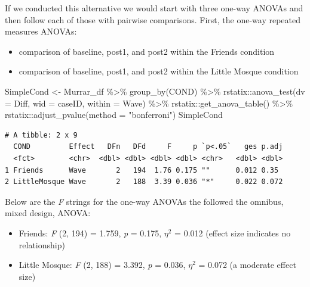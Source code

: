 \documentclass[
  11pt,
]{book}
\newenvironment{Shaded}{\begin{snugshade}}{\end{snugshade}}
\newcommand{\AttributeTok}[1]{\textcolor[rgb]{0.77,0.63,0.00}{#1}}
\newcommand{\FunctionTok}[1]{\textcolor[rgb]{0.00,0.00,0.00}{#1}}
\newcommand{\NormalTok}[1]{#1}
\newcommand{\OtherTok}[1]{\textcolor[rgb]{0.56,0.35,0.01}{#1}}
\newcommand{\SpecialCharTok}[1]{\textcolor[rgb]{0.00,0.00,0.00}{#1}}
\newcommand{\StringTok}[1]{\textcolor[rgb]{0.31,0.60,0.02}{#1}}
\providecommand{\tightlist}{%
  \setlength{\itemsep}{0pt}\setlength{\parskip}{0pt}}
\begin{document}
If we conducted this alternative we would start with three one-way ANOVAs and then follow each of those with pairwise comparisons. First, the one-way repeated measures ANOVAs:

\begin{itemize}
\tightlist
\item
  comparison of baseline, post1, and post2 within the Friends condition
\item
  comparison of baseline, post1, and post2 within the Little Mosque condition
\end{itemize}

\begin{Shaded}
\begin{Highlighting}[]
\NormalTok{SimpleCond }\OtherTok{\textless{}{-}}\NormalTok{ Murrar\_df }\SpecialCharTok{\%\textgreater{}\%}
    \FunctionTok{group\_by}\NormalTok{(COND) }\SpecialCharTok{\%\textgreater{}\%}
\NormalTok{    rstatix}\SpecialCharTok{::}\FunctionTok{anova\_test}\NormalTok{(}\AttributeTok{dv =}\NormalTok{ Diff, }\AttributeTok{wid =}\NormalTok{ caseID, }\AttributeTok{within =}\NormalTok{ Wave) }\SpecialCharTok{\%\textgreater{}\%}
\NormalTok{    rstatix}\SpecialCharTok{::}\FunctionTok{get\_anova\_table}\NormalTok{() }\SpecialCharTok{\%\textgreater{}\%}
\NormalTok{    rstatix}\SpecialCharTok{::}\FunctionTok{adjust\_pvalue}\NormalTok{(}\AttributeTok{method =} \StringTok{"bonferroni"}\NormalTok{)}
\NormalTok{SimpleCond}
\end{Highlighting}
\end{Shaded}

\begin{verbatim}
# A tibble: 2 x 9
  COND         Effect   DFn   DFd     F     p `p<.05`   ges p.adj
  <fct>        <chr>  <dbl> <dbl> <dbl> <dbl> <chr>   <dbl> <dbl>
1 Friends      Wave       2   194  1.76 0.175 ""      0.012 0.35 
2 LittleMosque Wave       2   188  3.39 0.036 "*"     0.022 0.072
\end{verbatim}

Below are the \emph{F} strings for the one-way ANOVAs the followed the omnibus, mixed design, ANOVA:

\begin{itemize}
\tightlist
\item
  Friends: \emph{F} (2, 194) = 1.759, \emph{p} = 0.175, \(\eta^{2}\) = 0.012 (effect size indicates no relationship)
\item
  Little Mosque: \emph{F} (2, 188) = 3.392, \emph{p} = 0.036, \(\eta^{2}\) = 0.072 (a moderate effect size)
\end{itemize}
\end{document}
